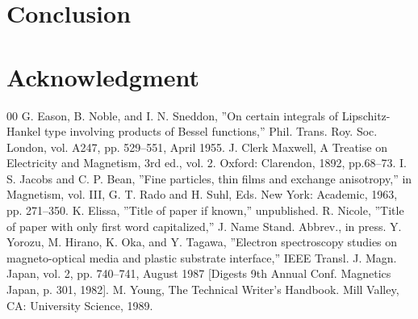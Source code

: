 \documentclass[10pt,conference, anon]{IEEEtran}
\begin{document}
\section{Conclusion}

\section*{Acknowledgment}



\begin{thebibliography}{00}
 G. Eason, B. Noble, and I. N. Sneddon, ''On certain integrals of Lipschitz-Hankel type involving products of Bessel functions,'' Phil. Trans. Roy. Soc. London, vol. A247, pp. 529--551, April 1955.
 J. Clerk Maxwell, A Treatise on Electricity and Magnetism, 3rd ed., vol. 2. Oxford: Clarendon, 1892, pp.68--73.
 I. S. Jacobs and C. P. Bean, ''Fine particles, thin films and exchange anisotropy,'' in Magnetism, vol. III, G. T. Rado and H. Suhl, Eds. New York: Academic, 1963, pp. 271--350.
 K. Elissa, ''Title of paper if known,'' unpublished.
 R. Nicole, ''Title of paper with only first word capitalized,'' J. Name Stand. Abbrev., in press.
 Y. Yorozu, M. Hirano, K. Oka, and Y. Tagawa, ''Electron spectroscopy studies on magneto-optical media and plastic substrate interface,'' IEEE Transl. J. Magn. Japan, vol. 2, pp. 740--741, August 1987 [Digests 9th Annual Conf. Magnetics Japan, p. 301, 1982].
 M. Young, The Technical Writer's Handbook. Mill Valley, CA: University Science, 1989.
\end{thebibliography}
\end{document}

